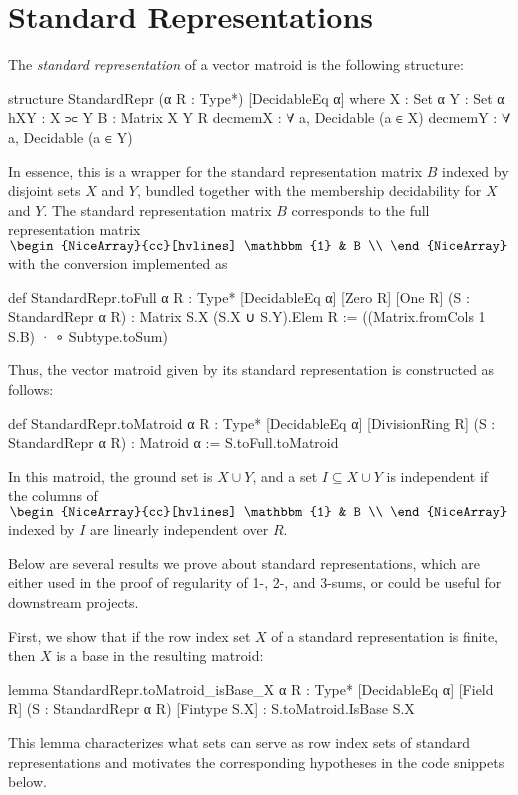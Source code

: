 \section{Standard Representations}

The \emph{standard representation} \cite{Oxley2011,Truemper2016} of a vector matroid is the following structure:
\begin{leancode}
structure StandardRepr (α R : Type*)
    [DecidableEq α] where
  X : Set α
  Y : Set α
  hXY : X ⫗ Y
  B : Matrix X Y R
  decmemX : ∀ a, Decidable (a ∈ X)
  decmemY : ∀ a, Decidable (a ∈ Y)
\end{leancode}
In essence, this is a wrapper for the standard representation matrix $B$ indexed by disjoint sets $X$ and $Y$, bundled together with the membership decidability for $X$ and $Y$. The standard representation matrix $B$ corresponds to the full representation matrix $\begin{NiceArray}{cc}[hvlines] \mathbbm{1} & B \\ \end{NiceArray}$ with the conversion implemented as
\begin{leancode}
def StandardRepr.toFull {α R : Type*}
    [DecidableEq α] [Zero R] [One R]
    (S : StandardRepr α R) :
    Matrix S.X (S.X ∪ S.Y).Elem R :=
  ((Matrix.fromCols 1 S.B) · ∘ Subtype.toSum)
\end{leancode}
Thus, the vector matroid given by its standard representation is constructed as follows:
\begin{leancode}
def StandardRepr.toMatroid {α R : Type*}
    [DecidableEq α] [DivisionRing R]
    (S : StandardRepr α R) :
    Matroid α :=
  S.toFull.toMatroid
\end{leancode}
In this matroid, the ground set is $X \cup Y$, and a set $I \subseteq X \cup Y$ is independent if the columns of
$\begin{NiceArray}{cc}[hvlines] \mathbbm{1} & B \\ \end{NiceArray}$
indexed by $I$ are linearly independent over $R$.

Below are several results we prove about standard representations, which are either used in the proof of regularity of 1-, 2-, and 3-sums, or could be useful for downstream projects.

First, we show that if the row index set $X$ of a standard representation is finite, then $X$ is a base in the resulting matroid:
\begin{leancode}
lemma StandardRepr.toMatroid_isBase_X
    {α R : Type*} [DecidableEq α] [Field R]
    (S : StandardRepr α R) [Fintype S.X] :
    S.toMatroid.IsBase S.X
\end{leancode}
This lemma characterizes what sets can serve as row index sets of standard representations and motivates the corresponding hypotheses in the code snippets below.

